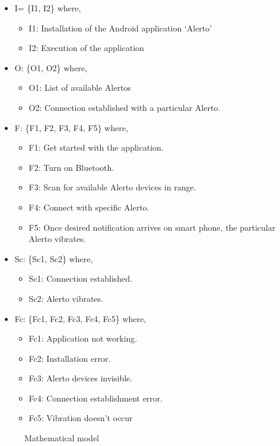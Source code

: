 \documentclass[12pt,a4paper]{report}
\begin{document}
\begin{itemize}
\item I= \{I1, I2\}
where,
\begin{itemize}
\item I1: Installation of the Android application ‘Alerto’
\item I2: Execution of the application
\end{itemize}
\item O: \{O1, O2\}
where,
\begin{itemize}
\item O1: List of available Alertos
\item O2: Connection established with a particular Alerto.
\end{itemize}
\item F: \{F1, F2, F3, F4, F5\}
where,
\begin{itemize}
\item F1: Get started with the application.
\item F2: Turn on Bluetooth.
\item F3: Scan for available Alerto devices in range.
\item F4: Connect with specific Alerto.
\item F5: Once desired notification arrives on smart phone, the particular Alerto vibrates.
\end{itemize}
\item Sc: \{Sc1, Sc2\}
where,
\begin{itemize}
\item Sc1: Connection established.
\item Sc2: Alerto vibrates.
\end{itemize}
\item Fc: \{Fc1, Fc2, Fc3, Fc4, Fc5\}
where,
\begin{itemize}
\item Fc1: Application not working.
\item Fc2: Installation error.
\item Fc3: Alerto devices invisible.
\item Fc4: Connection establishment error.
\item Fc5: Vibration doesn’t occur
\end{itemize}
\end{itemize}
\begin{figure}[!h]
	\begin{center}
			\caption{Mathematical model}
	\end{center}
\end{figure}
\end{document}
